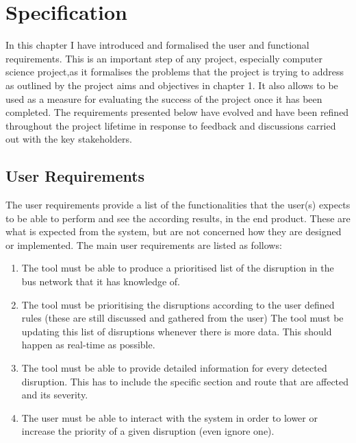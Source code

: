 \chapter{Specification}
In this chapter I have introduced and formalised the user and functional requirements.
This is an important step of any project, especially computer science project,as it formalises the problems that the project is trying to address as outlined by the project aims and objectives in chapter 1. It also allows to be used as a measure for evaluating the success of the project once it has been completed. The requirements presented below have evolved and have been refined throughout the project lifetime in response to feedback and discussions carried out with the key stakeholders.

\section{User Requirements}
The user requirements provide a list of the functionalities that the user(s) expects to be able to perform and see the according results, in the end product. These are what is expected from the system, but are not concerned how they are designed or implemented. The main user requirements are listed as follows:
\begin{enumerate}
	\item The tool must be able to produce a prioritised list of the disruption in
the bus network that it has knowledge of.
	\item The tool must be prioritising the disruptions according to the user defined
rules (these are still discussed and gathered from the user)
The tool must be updating this list of disruptions whenever there is more
data. This should happen as real-time as possible.
	\item The tool must be able to provide detailed information for every detected disruption. This has to include the specific section and route that are affected and its severity.
	\item The user must be able to interact with the system in order to lower or
increase the priority of a given disruption (even ignore one).
\end{enumerate}

